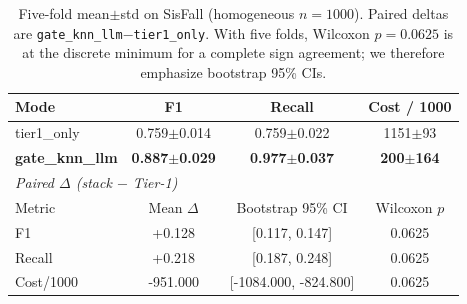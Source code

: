 \begin{table}[!t]
\centering
\caption{Five-fold mean$\pm$std on SisFall (homogeneous $n{=}1000$). Paired deltas are \texttt{gate\_knn\_llm}$-$\texttt{tier1\_only}. With five folds, Wilcoxon $p{=}0.0625$ is at the discrete minimum for a complete sign agreement; we therefore emphasize bootstrap 95\% CIs.}
\label{tab:meanstd}
\begin{tabular}{lccc}
\toprule
Mode & F1 & Recall & Cost / 1000 \\
\midrule
tier1\_only & 0.759$\pm$0.014 & 0.759$\pm$0.022 & 1151$\pm$93 \\
\textbf{gate\_knn\_llm} & \textbf{0.887$\pm$0.029} & \textbf{0.977$\pm$0.037} & \textbf{200$\pm$164} \\
\midrule
\multicolumn{4}{l}{\textit{Paired $\Delta$ (stack $-$ Tier-1)}} \\
Metric & Mean $\Delta$ & Bootstrap 95\% CI & Wilcoxon $p$ \\
\midrule
F1 & +0.128 & [0.117, 0.147] & 0.0625 \\
Recall & +0.218 & [0.187, 0.248] & 0.0625 \\
Cost/1000 & -951.000 & [-1084.000, -824.800] & 0.0625 \\
\bottomrule
\end{tabular}
\end{table}
